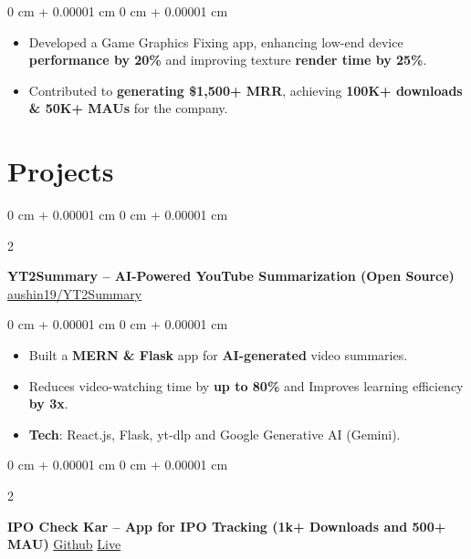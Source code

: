 \documentclass[10pt, letterpaper]{article}
\newenvironment{highlights}{
    \begin{itemize}[
        topsep=0.10 cm,
        parsep=0.10 cm,
        partopsep=0pt,
        itemsep=0pt,
        leftmargin=0 cm + 10pt,
        labelindent=0pt
    ]
}{
    \end{itemize}
} %
\newenvironment{onecolentry}{
    \begin{adjustwidth}{
        0 cm + 0.00001 cm
    }{
        0 cm + 0.00001 cm
    }
}{
    \end{adjustwidth}
} %
\newenvironment{twocolentry}[2][]{
    \onecolentry
    \def\secondColumn{#2}
    \setcolumnwidth{\fill, 4.5 cm}
    \begin{paracol}{2}
}{
    \switchcolumn \raggedleft \secondColumn
    \end{paracol}
    \endonecolentry
} %
\begin{document}
        \vspace{0.10 cm}
        \begin{onecolentry}
            \begin{highlights}
                \item Developed a Game Graphics Fixing app, enhancing low-end device \textbf{performance by 20\%} and improving texture \textbf{render time by 25\%}.
                \item Contributed to \textbf{generating \$1,500+ MRR}, achieving \textbf{100K+ downloads \& 50K+ MAUs} for the company.
            \end{highlights}
        \end{onecolentry}

        \section{Projects}



        
        \begin{twocolentry}{
            \href{https://github.com/aushin19/YT2Summary}{aushin19/YT2Summary}
        }
            \textbf{YT2Summary – AI-Powered YouTube Summarization (Open Source)}\end{twocolentry}

        \vspace{0.10 cm}
        \begin{onecolentry}
            \begin{highlights}
                \item Built a \textbf{MERN \& Flask} app for \textbf{AI-generated} video summaries.
                \item Reduces video-watching time by \textbf{up to 80\%} and Improves learning efficiency \textbf{by 3x}.
                \item \textbf{Tech}: React.js, Flask, yt-dlp and Google Generative AI (Gemini).
            \end{highlights}
        \end{onecolentry}


        \vspace{0.2 cm}

        \begin{twocolentry}{
            \href{https://github.com/aushin19/IPO_Check_Kar}{Github}
            \hspace{0.1 cm}
            \href{https://play.google.com/store/apps/details?id=com.chartianz.ipocheckkar}{Live}
        }
            \textbf{IPO Check Kar – App for IPO Tracking (1k+ Downloads and 500+ MAU)}\end{twocolentry}
\end{document}
